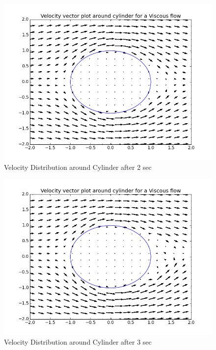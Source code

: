 \documentclass{article}
\begin{document}
\begin{figure}[H] \label{figure}
\includegraphics[width=12cm]{streamlines_two.png}
\caption{Velocity Distribution around Cylinder after 2 sec}
\label{figure:}
\end{figure}

\begin{figure}[H] \label{figure}
\includegraphics[width=12cm]{streamlines_three.png}
\caption{Velocity Distribution around Cylinder after 3 sec}
\label{figure:}
\end{figure} 
 
\end{document}
